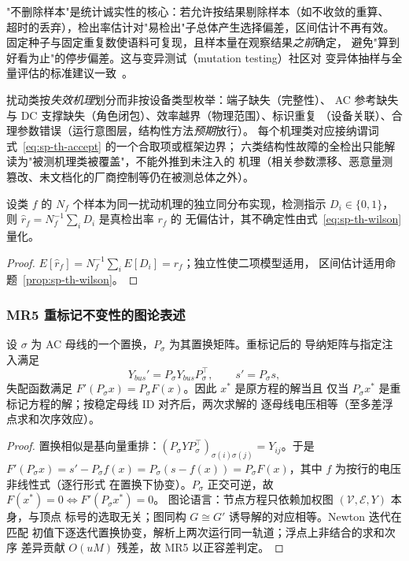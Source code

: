 \begin{remark}[无删除原则与选择偏差]
"不删除样本"是统计诚实性的核心：若允许按结果剔除样本（如不收敛的重算、
超时的丢弃），检出率估计对"易检出"子总体产生选择偏差，区间估计不再有效。
固定种子与固定重复数使语料可复现，且样本量在观察结果\emph{之前}确定，
避免"算到好看为止"的停步偏差。这与变异测试（mutation testing）社区对
变异体抽样与全量评估的标准建议一致~\cite{spth:jia11}。
\end{remark}

\begin{remark}[覆盖的结构口径]
扰动类按\emph{失效机理}划分而非按设备类型枚举：端子缺失（完整性）、
AC 参考缺失与 DC 支撑缺失（角色闭包）、效率越界（物理范围）、标识重复
（设备关联）、合理参数错误（运行意图层，结构性方法\emph{预期}放行）。
每个机理类对应接纳谓词式~\eqref{eq:sp-th-accept} 的一个合取项或框架边界；
六类结构性故障的全检出只能解读为"被测机理类被覆盖"，不能外推到未注入的
机理（相关参数漂移、恶意量测篡改、未文档化的厂商控制等仍在被测总体之外）。
\end{remark}

\begin{proposition}[检出率估计的良定义性]\label{prop:sp-th-detection}
设类 $f$ 的 $N_f$ 个样本为同一扰动机理的独立同分布实现，检测指示
$D_i\in\{0,1\}$，则 $\hat r_f=N_f^{-1}\sum_i D_i$ 是真检出率 $r_f$ 的
无偏估计，其不确定性由式~\eqref{eq:sp-th-wilson} 量化。
\end{proposition}
\begin{proof}
$E[\hat r_f]=N_f^{-1}\sum_i E[D_i]=r_f$；独立性使二项模型适用，
区间估计适用命题~\ref{prop:sp-th-wilson}。
\end{proof}

\subsubsection{MR5 重标记不变性的图论表述}
\begin{lemma}[置换相似下的方程不变性]\label{lem:sp-th-mr5}
设 $\sigma$ 为 AC 母线的一个置换，$P_\sigma$ 为其置换矩阵。重标记后的
导纳矩阵与指定注入满足
\begin{equation}
Y_{bus}'=P_\sigma Y_{bus}P_\sigma^{\!\top},\qquad
s'=P_\sigma s,
\end{equation}
失配函数满足 $F'(P_\sigma x)=P_\sigma F(x)$。因此 $x^*$ 是原方程的解当且
仅当 $P_\sigma x^*$ 是重标记方程的解；按稳定母线 ID 对齐后，两次求解的
逐母线电压相等（至多差浮点求和次序效应）。
\end{lemma}
\begin{proof}
置换相似是基向量重排：$(P_\sigma Y P_\sigma^{\!\top})_{\sigma(i)\sigma(j)}
=Y_{ij}$。于是
$F'(P_\sigma x)=s'-P_\sigma f(x)
=P_\sigma(s-f(x))=P_\sigma F(x)$，其中 $f$ 为按行的电压非线性式（逐行形式
在置换下协变）。$P_\sigma$ 正交可逆，故 $F(x^*)=0\iff F'(P_\sigma x^*)=0$。
图论语言：节点方程只依赖加权图 $(\mathcal V,\mathcal E,Y)$ 本身，与顶点
标号的选取无关；图同构 $G\cong G'$ 诱导解的对应相等。Newton 迭代在匹配
初值下逐迭代置换协变，解析上两次运行同一轨道；浮点上非结合的求和次序
差异贡献 $O(uM)$ 残差，故 MR5 以正容差判定。
\end{proof}

